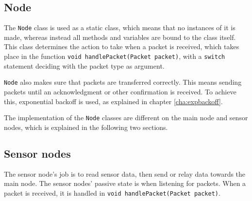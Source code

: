\subsection{Node}
The \texttt{Node} class is used as a static class, which means that no instances of it is made, whereas instead all methods and variables are bound to the class itself. This class determines the action to take when a packet is received, which takes place in the function \texttt{void handlePacket(Packet packet)}, with a \texttt{switch} statement deciding with the packet type as argument.

\texttt{Node} also makes sure that packets are transferred correctly. This means sending packets until an acknowledgment or other confirmation is received. To achieve this, exponential backoff is used, as explained in chapter \ref{cha:expbackoff}.

The implementation of the \texttt{Node} classes are different on the main node and sensor nodes, which is explained in the following two sections.

\subsection{Sensor nodes} 
The sensor node's job is to read sensor data, then send or relay data towards the main node. The sensor nodes' passive state is when listening for packets. When a packet is received, it is handled in \texttt{void handlePacket(Packet packet)}.  

